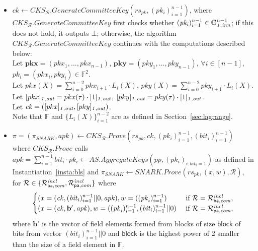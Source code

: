 \begin{construction}
\begin{itemize}
\item $\mathit{ck} \leftarrow \mathit{CKS_{\mathcal{R}}.GenerateCommitteeKey}(\mathit{rs_{pk}}, (\mathit{pk_i})_{i=1}^{n-1})$, where 
$\mathit{CKS_{\mathcal{R}}.GenerateCommitteeKey}$ first checks whether $(\mathit{pk_i})_{i=1}^{n-1} \in \mathbb{G}_{\mathit{1,inn}}^{n-1}$; 
if this does not hold, it outputs $\bot$; otherwise, the algorithm \\ $\mathit{CKS_{\mathcal{R}}.GenerateCommitteeKey}$ continues with the 
computations described below: \\
\noindent Let $\mathbf{pkx} = (\mathit{pkx_{1}}, \ldots, \mathit{pkx_{n-1}})$, $\mathbf{pky} = (\mathit{pky_{1}}, \ldots, \mathit{pky_{n-1}})$, $\forall i \in [n-1]$, $\mathit{pk_i} = (\mathit{pkx_i}, \mathit{pky_i}) \in \mathbb{F}^{2}$. \\
\noindent Let $pkx(X) = \sum_{i=0}^{n-2} \mathit{pkx_{i+1}} \cdot L_i(X)$, $pky(X) = \sum_{i=0}^{n-2} \mathit{pky_{i+1}} \cdot L_i(X)$.\\ 
\noindent Let $[pkx]_{\mathit{1,out}} = pkx(\tau) \cdot [1]_{\mathit{1,out}}$, $[pky]_{\mathit{1,out}} = pky(\tau) \cdot [1]_{\mathit{1,out}}$.\\ 
\noindent Let $\mathit{ck} = ([pkx]_{\mathit{1,out}}, [pky]_{\mathit{1,out}})$.\\
\noindent Note that $\mathbb{F}$ and $\{L_i(X)\}_{i=1}^{n-2}$ are as defined in Section~\ref{sec:lagrange}. 

\item $\pi = (\pi_{SNARK}, \mathit{apk}) \leftarrow \mathit{CKS_{\mathcal{R}}.Prove}
(\mathit{rs}_{\mathit{pk}}, \mathit{ck}, (\mathit{pk_i})_{i=1}^{n-1}, (\mathit{bit_i})_{i=1}^{n-1})$ 
where $\mathit{CKS_{\mathcal{R}}.Prove}$ calls \\ 
$\mathit{apk} = \sum_{i=1}^{n-1} \mathit{bit_i} \cdot \mathit{pk_i} \leftarrow \mathit{AS.AggregateKeys}(\mathit{pp}, (\mathit{pk_i})_{i:\mathit{bit_i = 1}})$ 
as defined in Instantiation~\ref{insta:bls} and $\pi_{SNARK} \leftarrow \mathit{SNARK.Prove}(\mathit{rs_{pk}}, (x,w), \mathcal{R})$, 
for $\mathcal{R} \in \{\mathcal{R}^{\mathit{incl}}_{\mathsf{ba},\mathit{com}}, \mathcal{R}^{\mathit{incl}}_{\mathsf{pa},\mathit{com}} \}$ where 
\begin{equation*}
\begin{cases}
 (x = (\mathit{ck}, (\mathit{bit_i})_{i=1}^{n-1}||0, \mathit{apk}), w = ((\mathit{pk}_i)_{i=1}^{n-1}) & \text{ if } \mathcal{R} = \mathcal{R}^{\mathit{incl}}_{\mathsf{ba},\mathit{com}},\\
 (x = (\mathit{ck}, \mathbf{b'}, \mathit{apk}), w = ((\mathit{pk}_i)_{i=1}^{n-1}, (\mathit{bit_i})_{i=1}^{n-1}||0) & \text{ if } \mathcal{R} = \mathcal{R}^{\mathit{incl}}_{\mathsf{pa},\mathit{com}}, \\
\end{cases}       
\end{equation*}
where $\mathbf{b'}$ is the vector of field elements formed from blocks of size $\mathsf{block}$ of bits from vector 
$(\mathit{bit_i})_{i=1}^{n-1}||0$ and $\mathsf{block}$ is the highest power of 2 smaller than the size of a field element in $\mathbb{F}$. 


\end{itemize}
\end{construction}
